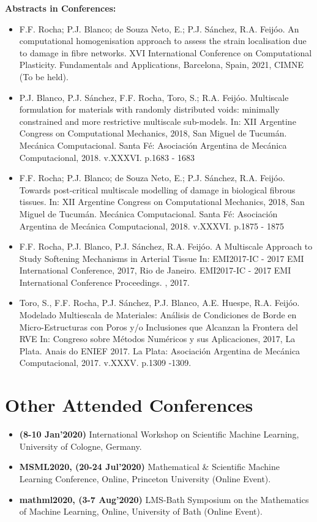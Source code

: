 \documentclass[11pt,letterpaper]{twentysecondcv} %
\begin{document}
\item \textbf{Abstracts in Conferences:} 
\begin{itemize}
    \item F.F. Rocha; P.J. Blanco; de Souza Neto, E.; P.J. Sánchez, R.A. Feijóo. An computational homogenisation approach to assess the strain localisation due to damage in fibre networks. XVI International Conference on Computational Plasticity. Fundamentals and Applications, Barcelona, Spain, 2021, CIMNE (To be held).
	\item P.J. Blanco, P.J. Sánchez, F.F. Rocha, Toro, S.; R.A. Feijóo.
	Multiscale formulation for materials with randomly distributed voids: minimally constrained and more restrictive multiscale sub-models. In: XII Argentine Congress on
	Computational Mechanics, 2018, San Miguel de Tucumán.
	Mecánica Computacional. Santa Fé: Asociación Argentina de Mecánica Computacional, 2018. v.XXXVI.
	p.1683 - 1683
	\item F.F. Rocha; P.J. Blanco; de Souza Neto, E.; P.J. Sánchez, R.A. Feijóo.
	Towards post-critical multiscale modelling of damage in biological fibrous tissues.
	In: XII Argentine Congress on Computational Mechanics, 2018, San Miguel de Tucumán.
	Mecánica Computacional. Santa Fé: Asociación Argentina de Mecánica Computacional, 2018. v.XXXVI.
	p.1875 - 1875
	\item F.F. Rocha, P.J. Blanco, P.J. Sánchez, R.A. Feijóo.
	A Multiscale Approach to Study Softening Mechanisms in Arterial Tissue In: EMI2017-IC - 2017 EMI
	International Conference, 2017, Rio de Janeiro. EMI2017-IC - 2017 EMI International Conference Proceedings. , 2017.
	\item Toro, S., F.F. Rocha, P.J. Sánchez, P.J. Blanco, A.E. Huespe, R.A. Feijóo.
	Modelado Multiescala de Materiales: Análisis de Condiciones de Borde en Micro-Estructuras con Poros y/o
	Inclusiones que Alcanzan la Frontera del RVE In: Congreso sobre Métodos Numéricos y sus Aplicaciones,
	2017, La Plata. Anais do ENIEF 2017. La Plata: Asociación Argentina de Mecánica Computacional, 2017. v.XXXV. p.1309 -1309.
\end{itemize}


\newpage

\makeprofile

\section{Other Attended Conferences}
\begin{itemize} 
 \item \textbf{(8-10 Jan'2020)} International Workshop on Scientific Machine Learning, University of Cologne, Germany.
\item \textbf{MSML2020, (20-24 Jul'2020)}  Mathematical & Scientific Machine Learning Conference,
 Online, Princeton University (Online Event).
\item \textbf{mathml2020, (3-7 Aug'2020)}  LMS-Bath Symposium on the Mathematics of Machine Learning, Online, University of Bath (Online Event).
\end{itemize}
\end{document}
